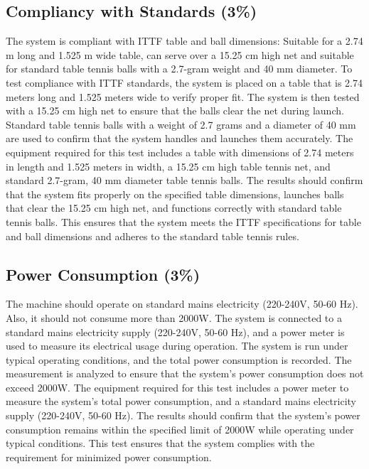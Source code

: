 \documentclass[12pt]{article}
\begin{document}
\subsection{Compliancy with Standards (3\%)}
The system is compliant with ITTF table and ball dimensions: Suitable for a 2.74 m long and 1.525 m wide table, can serve over a 15.25 cm high net and suitable for standard table tennis balls with a 2.7-gram weight and 40 mm diameter. To test compliance with ITTF standards, the system is placed on a table that is 2.74 meters long and 1.525 meters wide to verify proper fit. The system is then tested with a 15.25 cm high net to ensure that the balls clear the net during launch. Standard table tennis balls with a weight of 2.7 grams and a diameter of 40 mm are used to confirm that the system handles and launches them accurately. The equipment required for this test includes a table with dimensions of 2.74 meters in length and 1.525 meters in width, a 15.25 cm high table tennis net, and standard 2.7-gram, 40 mm diameter table tennis balls. The results should confirm that the system fits properly on the specified table dimensions, launches balls that clear the 15.25 cm high net, and functions correctly with standard table tennis balls. This ensures that the system meets the ITTF specifications for table and ball dimensions and adheres to the standard table tennis rules.

\subsection{Power Consumption (3\%)}
The machine should operate on standard mains electricity (220-240V, 50-60 Hz). Also, it should not consume more than 2000W.  The system is connected to a standard mains electricity supply (220-240V, 50-60 Hz), and a power meter is used to measure its electrical usage during operation. The system is run under typical operating conditions, and the total power consumption is recorded. The measurement is analyzed to ensure that the system’s power consumption does not exceed 2000W. The equipment required for this test includes a power meter to measure the system's total power consumption, and a standard mains electricity supply (220-240V, 50-60 Hz). The results should confirm that the system’s power consumption remains within the specified limit of 2000W while operating under typical conditions. This test ensures that the system complies with the requirement for minimized power consumption.
\end{document}
